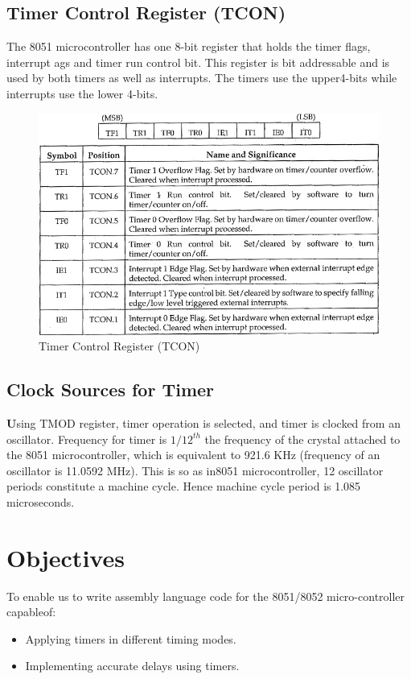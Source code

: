 \documentclass{article}
\begin{document}
\subsection{Timer Control Register (TCON)}
The 8051 microcontroller has one 8-bit register that holds the timer flags, interrupt ags and timer run control bit. This register is bit addressable and is used by both timers as well as interrupts. The timers use the upper4-bits while interrupts use the lower 4-bits.


\begin{figure}[H]
    \centering
    \includegraphics[scale=0.89,cframe=blue 0.5pt 3pt]{TCON.jpg}
    \caption{Timer Control Register (TCON)}
\end{figure}

\subsection{Clock Sources for Timer}
\textbf Using  TMOD  register,  timer operation  is  selected,  and timer  is clocked from an oscillator. Frequency for timer is $1/12^{th}$ the frequency of the crystal attached to the 8051 microcontroller, which is equivalent to 921.6 KHz (frequency of an oscillator is 11.0592  MHz).  This  is  so  as  in8051  microcontroller,  12  oscillator  periods constitute  a machine cycle. Hence machine cycle period is 1.085 microseconds.

\section{Objectives}
To enable us to write assembly language code for the 8051/8052 micro-controller capableof:
\begin{itemize}
    \item Applying timers in different timing modes.
    \item Implementing accurate delays using timers.
\end{itemize}
\end{document}
